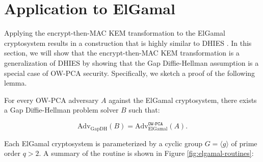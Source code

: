 \documentclass[runningheads]{llncs}
\begin{document}
\section{Application to ElGamal}\label{sec:application-to-elgamal}
Applying the encrypt-then-MAC KEM transformation to the ElGamal cryptosystem results in a construction that is highly similar to DHIES \cite{DBLP:conf/ctrsa/AbdallaBR01}. In this section, we will show that the encrypt-then-MAC KEM transformation is a generalization of DHIES by showing that the Gap Diffie-Hellman assumption is a special case of OW-PCA security. Specifically, we sketch a proof of the following lemma.

\begin{lemma}\label{lemma:elgamal-is-ow-pca}
    For every OW-PCA adversary $A$ against the ElGamal cryptosystem, there exists a Gap Diffie-Hellman problem solver $B$ such that:

    \begin{equation*}
        \text{Adv}_\text{GapDH}(B) = \text{Adv}_\text{ElGamal}^\texttt{OW-PCA}(A).
    \end{equation*}
\end{lemma}

Each ElGamal cryptosystem \cite{DBLP:journals/tit/Elgamal85} is parameterized by a cyclic group $G = \langle g \rangle$ of prime order $q > 2$. A summary of the routine is shown in Figure \ref{fig:elgamal-routines}:
\end{document}
